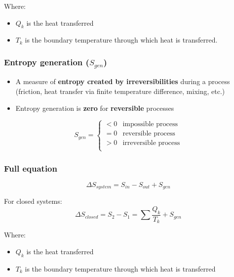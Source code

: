 \documentclass[11pt]{article}
\begin{document}
Where:
\begin{itemize}
\item \(Q_k\) is the heat transferred
\item \(T_k\) is the boundary temperature through which heat is transferred.
\end{itemize}

\subsubsection{Entropy generation (\(S_{gen}\))}
\label{sec:orge3fd8e8}
\begin{itemize}
\item A measure of \textbf{entropy created by irreversibilities} during a process (friction, heat transfer via finite temperature difference, mixing, etc.)
\item Entropy generation is \textbf{zero} for \textbf{reversible} processes
\end{itemize}

\begin{displaymath}
S_{gen} =
\begin{cases}
< 0 & \text{impossible process} \\
= 0 & \text{reversible process} \\
> 0 & \text{irreversible process} \\
\end{cases}
\end{displaymath}

\subsubsection{Full equation}
\label{sec:org6f6006a}
\[\Delta S_{system} = S_{in} - S_{out} + S_{gen}\]

For closed systems:
\[\Delta S_{closed} = S_2 - S_1 = \sum \frac{Q_k}{T_k} + S_{gen}\]

Where:
\begin{itemize}
\item \(Q_k\) is the heat transferred
\item \(T_k\) is the boundary temperature through which heat is transferred
\end{itemize}
\end{document}
